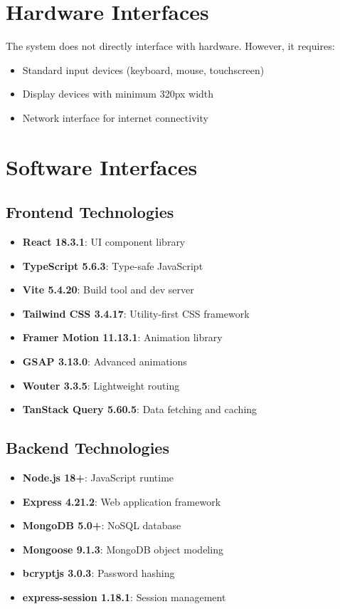 \documentclass{scrreprt}
\begin{document}
\section{Hardware Interfaces}
The system does not directly interface with hardware. However, it requires:
\begin{itemize}
\item Standard input devices (keyboard, mouse, touchscreen)
\item Display devices with minimum 320px width
\item Network interface for internet connectivity
\end{itemize}

\section{Software Interfaces}

\subsection{Frontend Technologies}
\begin{itemize}
\item \textbf{React 18.3.1}: UI component library
\item \textbf{TypeScript 5.6.3}: Type-safe JavaScript
\item \textbf{Vite 5.4.20}: Build tool and dev server
\item \textbf{Tailwind CSS 3.4.17}: Utility-first CSS framework
\item \textbf{Framer Motion 11.13.1}: Animation library
\item \textbf{GSAP 3.13.0}: Advanced animations
\item \textbf{Wouter 3.3.5}: Lightweight routing
\item \textbf{TanStack Query 5.60.5}: Data fetching and caching
\end{itemize}

\subsection{Backend Technologies}
\begin{itemize}
\item \textbf{Node.js 18+}: JavaScript runtime
\item \textbf{Express 4.21.2}: Web application framework
\item \textbf{MongoDB 5.0+}: NoSQL database
\item \textbf{Mongoose 9.1.3}: MongoDB object modeling
\item \textbf{bcryptjs 3.0.3}: Password hashing
\item \textbf{express-session 1.18.1}: Session management
\end{itemize}
\end{document}
